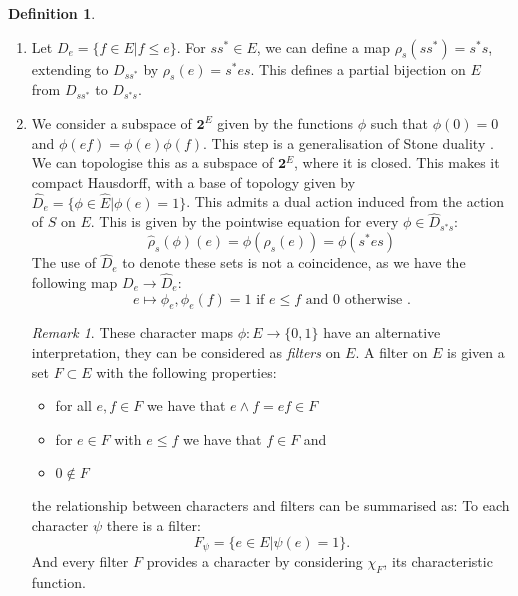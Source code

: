 \documentclass[11pt]{amsart}
\theoremstyle{plain}
\theoremstyle{definition}%
\newtheorem{definition}[theorem]{Definition}%
\theoremstyle{remark}%
\newtheorem{remark}[theorem]{Remark}%
\newcommand{\E}{\widehat{E}}
\begin{document}
\begin{definition}
\begin{enumerate}
\item Let $D_{e}=\lbrace f \in E | f \leq e \rbrace$. For $ss^{*} \in E$, we can define a map $\rho_{s}(ss^{*})=s^{*}s$, extending to $D_{ss^{*}}$ by $\rho_{s}(e) = s^{*}es$. This defines a partial bijection on $E$ from $D_{ss^{*}}$ to $D_{s^{*}s}$. 

\item We consider a subspace of $\textbf{2}^{E}$ given by the functions $\phi$ such that $\phi(0)=0$ and $\phi(ef)=\phi(e)\phi(f)$. This step is a generalisation of Stone duality \cite{MR2672179}. We can topologise this as a subspace of $\textbf{2}^{E}$, where it is closed. This makes it compact Hausdorff, with a base of topology given by $\widehat{D}_{e}= \lbrace \phi \in \E | \phi(e)=1 \rbrace$. This admits a dual action induced from the action of $S$ on $E$. This is given by the pointwise equation for every $\phi \in \widehat{D}_{s^{*}s}$:
\begin{equation*}
\widehat{\rho}_{s}(\phi)(e)=\phi(\rho_{s}(e))=\phi(s^{*}es)
\end{equation*}
The use of $\widehat{D}_{e}$ to denote these sets is not a coincidence, as we have the following map $D_{e} \rightarrow \widehat{D}_{e}$:
\begin{equation*}
e \mapsto \phi_{e}, \phi_{e}(f)=1 \mbox{ if } e \leq f \mbox{ and } 0 \mbox{ otherwise }.
\end{equation*}
\begin{remark}
These character maps $\phi: E \rightarrow \lbrace 0,1 \rbrace$ have an alternative interpretation, they can be considered as \textit{filters} on $E$. A filter on $E$ is given  a set $F \subset E$ with the following properties:
\begin{itemize}
\item for all $e,f \in F$ we have that $e\wedge f=ef \in F$
\item for $e\in F$ with $e \leq f$ we have that $f \in F$ and
\item $0 \not\in F$
\end{itemize}
the relationship between characters and filters can be summarised as: To each character $\psi$ there is a filter:
\begin{equation*}
F_{\psi}= \lbrace e \in E | \psi(e)=1 \rbrace.
\end{equation*}
And every filter $F$ provides a character by considering $\chi_{F}$, its characteristic function.
\end{remark}


\end{enumerate}
\end{definition}
\end{document}
